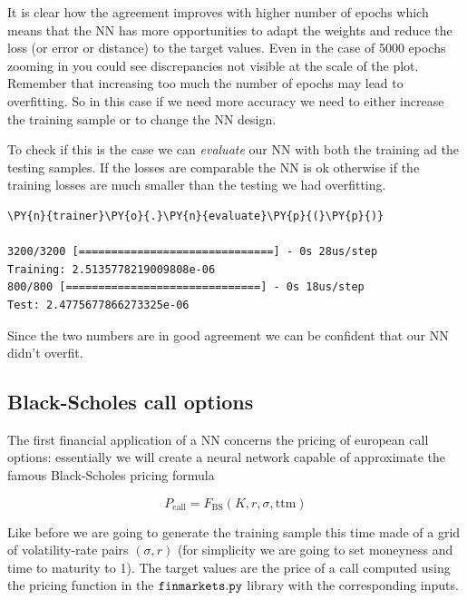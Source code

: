 It is clear how the agreement improves with higher number of epochs
which means that the NN has more opportunities to adapt the weights and
reduce the loss (or error or distance) to the target values. Even in the
case of 5000 epochs zooming in you could see discrepancies not visible
at the scale of the plot. Remember that increasing too much the number
of epochs may lead to overfitting. So in this case if we need more
accuracy we need to either increase the training sample or to change the
NN design.

To check if this is the case we can \emph{evaluate} our NN with both the
training ad the testing samples. If the losses are comparable the NN is
ok otherwise if the training losses are much smaller than the testing we
had overfitting.

\begin{tcolorbox}[breakable, size=fbox, boxrule=1pt, pad at break*=1mm,colback=cellbackground, colframe=cellborder]
\begin{Verbatim}[commandchars=\\\{\}]
\PY{n}{trainer}\PY{o}{.}\PY{n}{evaluate}\PY{p}{(}\PY{p}{)}

3200/3200 [==============================] - 0s 28us/step
Training: 2.5135778219009808e-06
800/800 [==============================] - 0s 18us/step
Test: 2.4775677866273325e-06
\end{Verbatim}
\end{tcolorbox}

Since the two numbers are in good agreement we can be confident that our
NN didn't overfit.

\subsection{Black-Scholes call
options}\label{black-scholes-call-options}

The first financial application of a NN concerns the pricing of european
call options: essentially we will create a neural network capable of
approximate the famous Black-Scholes pricing formula

\[ P_\textrm{call} = F_\textrm{BS}(K, r, \sigma, \mathrm{ttm})\]

Like before we are going to generate the training sample this time made
of a grid of volatility-rate pairs \((\sigma, r)\) (for simplicity we
are going to set moneyness and time to maturity to 1). The target values
are the price of a call computed using the pricing function in the
\(\tt{finmarkets.py}\) library with the corresponding inputs.

